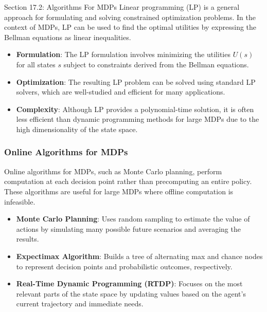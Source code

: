 \begin{notes}{Section 17.2: Algorithms For MDPs}
    Linear programming (LP) is a general approach for formulating and solving constrained optimization problems. In the context of MDPs, LP can be used to find the optimal utilities by expressing 
    the Bellman equations as linear inequalities.
    
    \begin{highlight}
    
        \begin{itemize}
            \item \textbf{Formulation}: The LP formulation involves minimizing the utilities \( U(s) \) for all states \( s \) subject to constraints derived from the Bellman equations.
            \item \textbf{Optimization}: The resulting LP problem can be solved using standard LP solvers, which are well-studied and efficient for many applications.
            \item \textbf{Complexity}: Although LP provides a polynomial-time solution, it is often less efficient than dynamic programming methods for large MDPs due to the high dimensionality of the state space.
        \end{itemize}
    
    \end{highlight}
    
    \subsubsection*{Online Algorithms for MDPs}
    
    Online algorithms for MDPs, such as Monte Carlo planning, perform computation at each decision point rather than precomputing an entire policy. These algorithms are useful for large MDPs where 
    offline computation is infeasible.
    
    \begin{highlight}
    
        \begin{itemize}
            \item \textbf{Monte Carlo Planning}: Uses random sampling to estimate the value of actions by simulating many possible future scenarios and averaging the results.
            \item \textbf{Expectimax Algorithm}: Builds a tree of alternating max and chance nodes to represent decision points and probabilistic outcomes, respectively.
            \item \textbf{Real-Time Dynamic Programming (RTDP)}: Focuses on the most relevant parts of the state space by updating values based on the agent's current trajectory and immediate needs.
        \end{itemize}
    

\end{highlight}
\end{notes}
